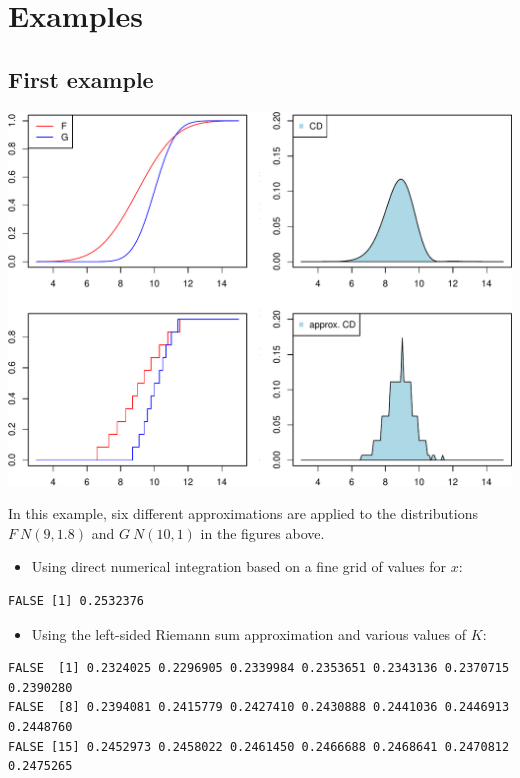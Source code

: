 \documentclass[
]{article}
\providecommand{\tightlist}{%
  \setlength{\itemsep}{0pt}\setlength{\parskip}{0pt}}
\begin{document}
\hypertarget{examples}{%
\section{Examples}\label{examples}}

\hypertarget{first-example}{%
\subsection{First example}\label{first-example}}

\begin{center}\includegraphics{cd_approx_2_files/figure-latex/ex1-1} \end{center}

In this example, six different approximations are applied to the
distributions \(F~N(9, 1.8)\) and \(G~N(10, 1)\) in the figures above.

\begin{itemize}
\tightlist
\item
  Using direct numerical integration based on a fine grid of values for
  \(x\):
\end{itemize}

\begin{verbatim}
FALSE [1] 0.2532376
\end{verbatim}

\begin{itemize}
\tightlist
\item
  Using the left-sided Riemann sum approximation and various values of
  \(K\):
\end{itemize}

\begin{verbatim}
FALSE  [1] 0.2324025 0.2296905 0.2339984 0.2353651 0.2343136 0.2370715 0.2390280
FALSE  [8] 0.2394081 0.2415779 0.2427410 0.2430888 0.2441036 0.2446913 0.2448760
FALSE [15] 0.2452973 0.2458022 0.2461450 0.2466688 0.2468641 0.2470812 0.2475265
\end{verbatim}
\end{document}
